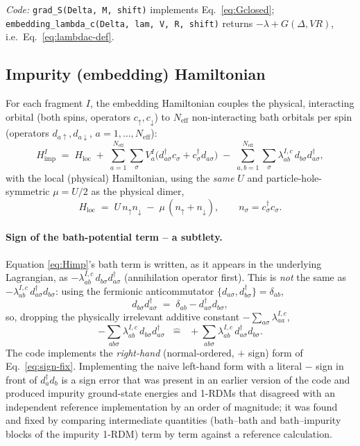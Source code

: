 \documentclass[11pt]{article}
\newcommand{\Neff}{N_{\mathrm{eff}}}
\newcommand{\Himp}{H_{\mathrm{imp}}}
\newcommand{\Hloc}{H_{\mathrm{loc}}}
\begin{document}
\emph{Code:} \texttt{grad\_S(Delta, M, shift)} implements
Eq.~\eqref{eq:Gclosed}; \texttt{embedding\_lambda\_c(Delta, lam, V, R, shift)}
returns $-\lambda+G(\Delta,VR)$, i.e.\ Eq.~\eqref{eq:lambdac-def}.

\subsection{Impurity (embedding) Hamiltonian}
\label{sec:impurity}

For each fragment $I$, the embedding Hamiltonian couples the physical,
interacting orbital (both spins, operators $c_{\uparrow},c_{\downarrow}$) to
$\Neff$ non-interacting bath orbitals per spin (operators
$d_{a\uparrow},d_{a\downarrow}$, $a=1,\dots,\Neff$):
\begin{equation}
  \Himp^{I} \;=\; \Hloc \;+\; \sum_{a=1}^{\Neff}\sum_{\sigma}
    V^{I}_{a}\bigl(d^{\dagger}_{a\sigma}c_{\sigma} + c^{\dagger}_{\sigma}d_{a\sigma}\bigr)
    \;-\; \sum_{a,b=1}^{\Neff}\sum_{\sigma}\lambda^{I,c}_{ab}\,d_{b\sigma}d^{\dagger}_{a\sigma},
  \label{eq:Himp}
\end{equation}
with the local (physical) Hamiltonian, using the \emph{same} $U$ and
particle-hole-symmetric $\mu=U/2$ as the physical dimer,
\begin{equation}
  \Hloc \;=\; U\,n_{\uparrow}n_{\downarrow} \;-\; \mu\,(n_{\uparrow}+n_{\downarrow}), \qquad
  n_\sigma = c^{\dagger}_\sigma c_\sigma .
\end{equation}

\paragraph{Sign of the bath-potential term -- a subtlety.} Equation
\eqref{eq:Himp}'s bath term is written, as it appears in the underlying
Lagrangian, as $-\lambda^{I,c}_{ab}\,d_{b\sigma}d^{\dagger}_{a\sigma}$
(annihilation operator first). This is \emph{not} the same as
$-\lambda^{I,c}_{ab}\,d^{\dagger}_{a\sigma}d_{b\sigma}$: using the fermionic
anticommutator $\{d_{a\sigma},d^{\dagger}_{b\sigma}\}=\delta_{ab}$,
\begin{equation}
  d_{b\sigma}d^{\dagger}_{a\sigma} \;=\; \delta_{ab} - d^{\dagger}_{a\sigma}d_{b\sigma},
\end{equation}
so, dropping the physically irrelevant additive constant $-\sum_{a\sigma}\lambda^{I,c}_{aa}$,
\begin{equation}
  -\sum_{ab\sigma}\lambda^{I,c}_{ab}\,d_{b\sigma}d^{\dagger}_{a\sigma}
  \;\;\widehat{=}\;\;
  +\sum_{ab\sigma}\lambda^{I,c}_{ab}\,d^{\dagger}_{a\sigma}d_{b\sigma} .
  \label{eq:sign-fix}
\end{equation}
The code implements the \emph{right-hand} (normal-ordered, $+$ sign) form of
Eq.~\eqref{eq:sign-fix}. Implementing the naive left-hand form with a
literal $-$ sign in front of $d^{\dagger}_a d_b$ is a sign error that was
present in an earlier version of the code and produced impurity ground-state
energies and 1-RDMs that disagreed with an independent reference
implementation by an order of magnitude; it was found and fixed by comparing
intermediate quantities (bath--bath and bath--impurity blocks of the
impurity 1-RDM) term by term against a reference calculation.
\end{document}
